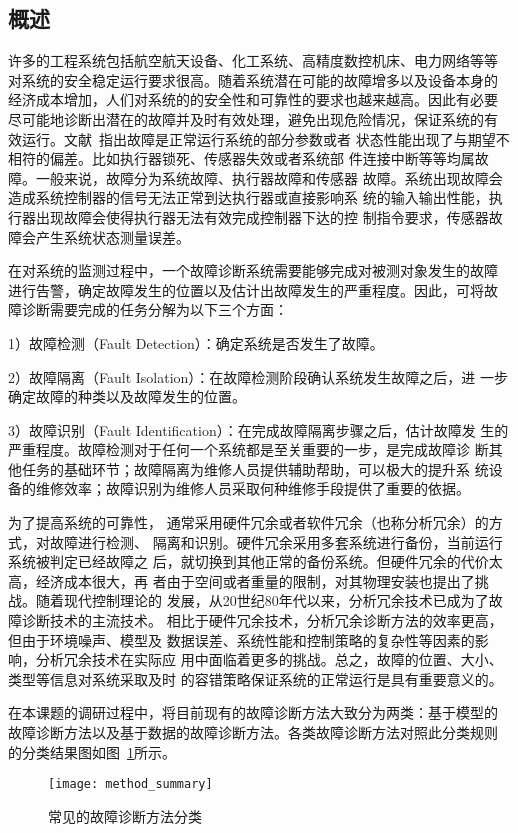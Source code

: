 \subsection{概述}

许多的工程系统包括航空航天设备、化工系统、高精度数控机床、电力网络等等
对系统的安全稳定运行要求很高。随着系统潜在可能的故障增多以及设备本身的
经济成本增加，人们对系统的的安全性和可靠性的要求也越来越高。因此有必要
尽可能地诊断出潜在的故障并及时有效处理，避免出现危险情况，保证系统的有
效运行。文献~指出故障是正常运行系统的部分参数或者
状态性能出现了与期望不相符的偏差。比如执行器锁死、传感器失效或者系统部
件连接中断等等均属故障。一般来说，故障分为系统故障、执行器故障和传感器
故障。系统出现故障会造成系统控制器的信号无法正常到达执行器或直接影响系
统的输入输出性能，执行器出现故障会使得执行器无法有效完成控制器下达的控
制指令要求，传感器故障会产生系统状态测量误差。

在对系统的监测过程中，一个故障诊断系统需要能够完成对被测对象发生的故障
进行告警，确定故障发生的位置以及估计出故障发生的严重程度。因此，可将故
障诊断需要完成的任务分解为以下三个方面：

1）故障检测（Fault Detection）：确定系统是否发生了故障。

2）故障隔离（Fault Isolation）：在故障检测阶段确认系统发生故障之后，进
一步确定故障的种类以及故障发生的位置。

3）故障识别（Fault Identification）：在完成故障隔离步骤之后，估计故障发
生的严重程度。故障检测对于任何一个系统都是至关重要的一步，是完成故障诊
断其他任务的基础环节；故障隔离为维修人员提供辅助帮助，可以极大的提升系
统设备的维修效率；故障识别为维修人员采取何种维修手段提供了重要的依据。

为了提高系统的可靠性，
通常采用硬件冗余或者软件冗余（也称分析冗余）的方式，对故障进行检测、
隔离和识别。硬件冗余采用多套系统进行备份，当前运行系统被判定已经故障之
后，就切换到其他正常的备份系统。但硬件冗余的代价太高，经济成本很大，再
者由于空间或者重量的限制，对其物理安装也提出了挑战。随着现代控制理论的
发展，从20世纪80年代以来，分析冗余技术已成为了故障诊断技术的主流技术。
相比于硬件冗余技术，分析冗余诊断方法的效率更高，但由于环境噪声、模型及
数据误差、系统性能和控制策略的复杂性等因素的影响，分析冗余技术在实际应
用中面临着更多的挑战。总之，故障的位置、大小、类型等信息对系统采取及时
的容错策略保证系统的正常运行是具有重要意义的。

在本课题的调研过程中，将目前现有的故障诊断方法大致分为两类：基于模型的
故障诊断方法以及基于数据的故障诊断方法。各类故障诊断方法对照此分类规则
的分类结果图如图~\ref{fig:method_summary}所示。
\begin{figure}[ht]
  \centering
  \texttt{[image: method\_summary]}
  \caption{常见的故障诊断方法分类}
  \label{fig:method_summary}
\end{figure}

